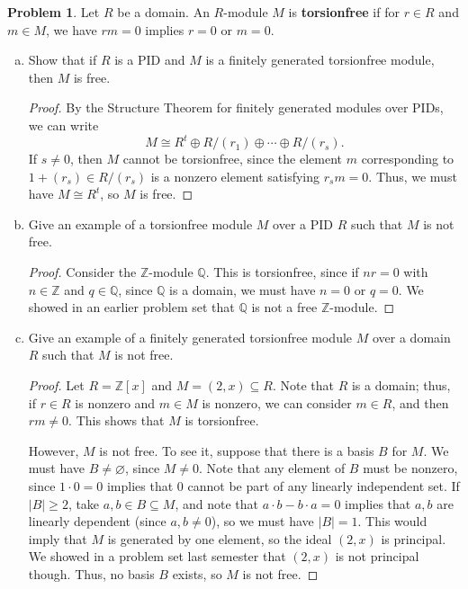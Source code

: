 \documentclass[11pt]{article}
\newcommand{\Q}{\mathbb{Q}}
\newcommand{\Z}{\mathbb{Z}}
\theoremstyle{definition}
\newtheorem{problem}{Problem}
\begin{document}
\begin{problem} Let $R$ be a domain. An $R$-module $M$ is \textbf{torsionfree} if for $r\in R$ and $m\in M$, we have $rm=0$ implies $r=0$ or $m=0$.
\begin{enumerate}[(a)]
\item Show that if $R$ is a PID and $M$ is a finitely generated torsionfree module, then $M$ is free.
\begin{proof}
By the Structure Theorem for finitely generated modules over PIDs, we can write
\[ M \cong R^t \oplus R/(r_1) \oplus \cdots \oplus R/(r_s).\]
If $s\neq 0$, then $M$ cannot be torsionfree, since the element $m$ corresponding to $1+(r_s)\in R/(r_s)$ is a nonzero element satisfying $r_s m=0$. Thus, we must have $M\cong R^t$, so $M$ is free.
\end{proof}
\item Give an example of a torsionfree module $M$ over a PID $R$ such that $M$ is not free.
\begin{proof}
Consider the $\Z$-module $\Q$. This is torsionfree, since if $nr=0$ with $n\in \Z$ and $q\in \Q$, since $\Q$ is a domain, we must have $n=0$ or $q=0$. We showed in an earlier problem set that $\Q$ is not a free $\Z$-module.
\end{proof}
\item Give an example of a finitely generated torsionfree module $M$ over a domain $R$ such that $M$ is not free.
\begin{proof}
Let $R=\Z[x]$ and $M=(2,x) \subseteq R$. Note that $R$ is a domain; thus, if $r\in R$ is nonzero and $m\in M$ is nonzero, we can consider $m\in R$, and then $rm\neq 0$. This shows that $M$ is torsionfree.

However, $M$ is not free. To see it, suppose that there is a basis $B$ for $M$. We must have $B\neq \varnothing$, since $M\neq 0$. Note that any element of $B$ must be nonzero, since $1\cdot 0=0$ implies that $0$ cannot be part of any linearly independent set. If $|B|\geq 2$, take $a,b\in B \subseteq M$, and note that $a\cdot b - b\cdot a = 0$ implies that $a,b$ are linearly dependent (since $a,b\neq 0$), so we must have $|B|=1$. This would imply that $M$ is generated by one element, so the ideal $(2,x)$ is principal. We showed in a problem set last semester that $(2,x)$ is not principal though. Thus, no basis $B$ exists, so $M$ is not free.
\end{proof}
\end{enumerate}
\end{problem}
\end{document}
